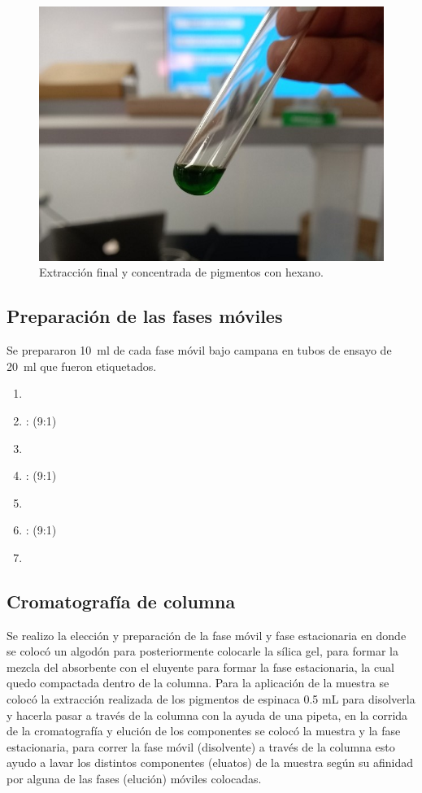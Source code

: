 \documentclass{ITESO-Report}
\begin{document}
\begin{figure}[htpb]
    \centering
    \includegraphics[width=0.9\columnwidth]{figuras/final_extract.jpg}
    \caption{Extracción final y concentrada de pigmentos con hexano.}
    \label{fig:final-extract}
\end{figure}

\subsection{Preparación de las fases móviles}\label{fases moviles}

Se prepararon \qty{10}{\ml} de cada fase móvil bajo campana en tubos de ensayo de \qty{20}{\ml} que fueron etiquetados.

\begin{enumerate}
    \setlength{\itemsep}{0pt}
    \item {}
    \item {}: (9:1)
    \item {}
    \item {}: (9:1)
    \item {}
    \item {}: (9:1)
    \item {}
\end{enumerate}

\subsection{Cromatografía de columna}\label{cromatografia}

Se realizo la elección y preparación de la fase móvil y fase estacionaria en donde se colocó un algodón para posteriormente colocarle la sílica gel, para formar la mezcla del absorbente con el eluyente para formar la fase estacionaria, la cual quedo compactada dentro de la columna. Para la aplicación de la muestra se colocó la extracción realizada de los pigmentos de espinaca 0.5 mL para disolverla y hacerla pasar a través de la columna con la ayuda de una pipeta, en la corrida de la cromatografía y elución de los componentes se colocó la muestra y la fase estacionaria, para correr la fase móvil (disolvente) a través de la columna esto ayudo a lavar los distintos componentes (eluatos) de la muestra según su afinidad por alguna de las fases (elución) móviles colocadas.
\end{document}
